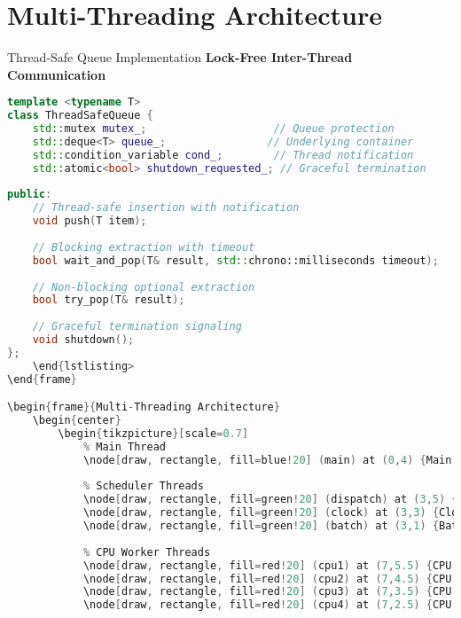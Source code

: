 \documentclass[10pt]{beamer}
\begin{document}
\section{Multi-Threading Architecture}

\begin{frame}[fragile]{Thread-Safe Queue Implementation}
    \textbf{Lock-Free Inter-Thread Communication}
    \begin{lstlisting}[language=C++]
template <typename T>
class ThreadSafeQueue {
    std::mutex mutex_;                    // Queue protection
    std::deque<T> queue_;                // Underlying container
    std::condition_variable cond_;        // Thread notification
    std::atomic<bool> shutdown_requested_; // Graceful termination
    
public:
    // Thread-safe insertion with notification
    void push(T item);
    
    // Blocking extraction with timeout
    bool wait_and_pop(T& result, std::chrono::milliseconds timeout);
    
    // Non-blocking optional extraction
    bool try_pop(T& result);
    
    // Graceful termination signaling
    void shutdown();
};
    \end{lstlisting>
\end{frame}

\begin{frame}{Multi-Threading Architecture}
    \begin{center}
        \begin{tikzpicture}[scale=0.7]
            % Main Thread
            \node[draw, rectangle, fill=blue!20] (main) at (0,4) {Main Thread};
            
            % Scheduler Threads
            \node[draw, rectangle, fill=green!20] (dispatch) at (3,5) {Dispatch Thread};
            \node[draw, rectangle, fill=green!20] (clock) at (3,3) {Clock Thread};
            \node[draw, rectangle, fill=green!20] (batch) at (3,1) {Batch Gen Thread};
            
            % CPU Worker Threads
            \node[draw, rectangle, fill=red!20] (cpu1) at (7,5.5) {CPU Worker 1};
            \node[draw, rectangle, fill=red!20] (cpu2) at (7,4.5) {CPU Worker 2};
            \node[draw, rectangle, fill=red!20] (cpu3) at (7,3.5) {CPU Worker 3};
            \node[draw, rectangle, fill=red!20] (cpu4) at (7,2.5) {CPU Worker 4};
            

\end{lstlisting}
\end{frame}
\end{document}
